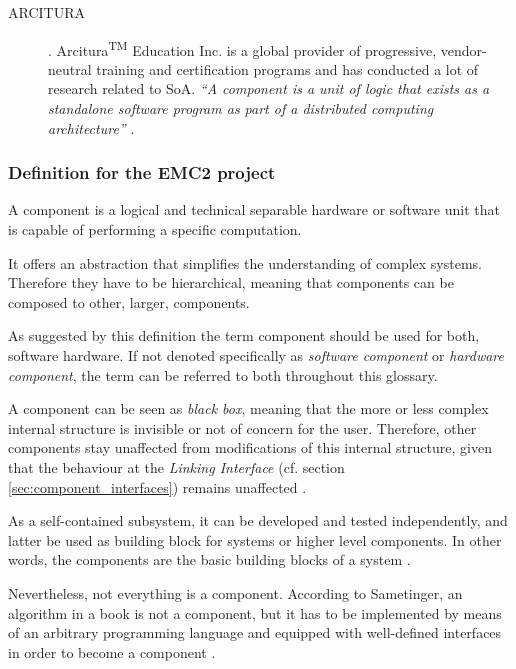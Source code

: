 \begin{description}
	\item [ARCITURA].
	Arcitura\textsuperscript{TM} Education Inc. is a global provider of progressive, vendor-neutral training and certification programs and has conducted a lot of research related to SoA.
	\emph{``A component is a unit of logic that exists as a standalone software program as part of a distributed computing architecture''} \cite{arcitura}.
 \end{description}


\subsubsection{Definition for the EMC2 project}


\begin{myquote}
A component is a logical and technical separable hardware or software unit that is capable of performing a specific computation.

It offers an abstraction that simplifies the understanding of complex systems. Therefore they have to be hierarchical, meaning that components can be composed to other, larger, components.
\end{myquote}

As suggested by this definition the term component should be used for both, software hardware. If not denoted specifically as \emph{software component} or \emph{hardware component}, the term can be referred to both throughout this glossary.

A component can be seen as \emph{black box}, meaning that the more or less complex internal structure is invisible or not of concern for the user. Therefore, other components stay unaffected from modifications of this internal structure, given that the behaviour at the \emph{Linking Interface} (cf. section \ref{sec:component_interfaces}) remains unaffected \cite[p.38-39]{genesys} \cite{autosar_intro} \cite{sametinger}.

As a self-contained subsystem, it can be developed and tested independently, and latter be used as building block for systems or higher level components. In other words, the components are the basic building blocks of a system \cite{ning}. 

Nevertheless, not everything is a component. According to Sametinger, an algorithm in a book is not a component, but it has to be implemented by means of an arbitrary programming language and equipped with well-defined interfaces in order to become a component \cite[p.2-3]{sametinger}.


